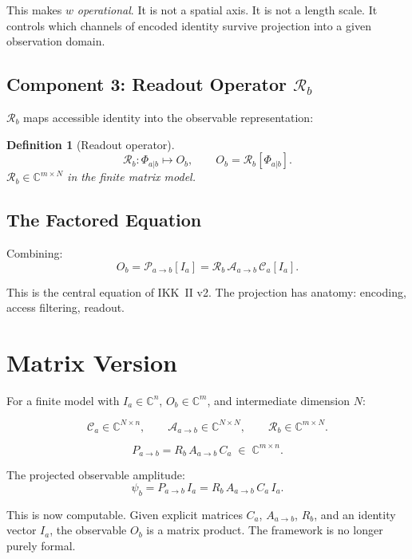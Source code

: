 \documentclass[11pt,a4paper,oneside]{article}
\newtheorem{definition}{Definition}[section]
\newcommand{\Ia}{I_a}
\newcommand{\Pab}{\mathcal{P}_{a\to b}}
\newcommand{\Ca}{\mathcal{C}_a}
\newcommand{\Aab}{\mathcal{A}_{a\to b}}
\newcommand{\Rb}{\mathcal{R}_b}
\newcommand{\PhiAb}{\Phi_{a|b}}         %
\newcommand{\psiab}{\psi_b}
\newcommand{\wcoord}{w}
\begin{document}
This makes $\wcoord$ \emph{operational}. It is not a spatial axis. It is not a length scale. It controls which channels of encoded identity survive projection into a given observation domain.

\subsection{Component 3: Readout Operator $\Rb$}

$\Rb$ maps accessible identity into the observable representation:

\begin{definition}[Readout operator]
\[
\Rb : \PhiAb \mapsto O_b,\qquad O_b = \Rb[\PhiAb].
\]
$\Rb \in \mathbb{C}^{m \times N}$ in the finite matrix model.
\end{definition}

\subsection{The Factored Equation}

Combining:
\[
\boxed{O_b = \Pab[\Ia] = \Rb\,\Aab\,\Ca[\Ia].}
\]

This is the central equation of IKK~II v2. The projection has anatomy: encoding, access filtering, readout.

\section{Matrix Version}

For a finite model with $\Ia \in \mathbb{C}^n$, $O_b \in \mathbb{C}^m$, and intermediate dimension $N$:

\[
\Ca \in \mathbb{C}^{N \times n},\qquad
\Aab \in \mathbb{C}^{N \times N},\qquad
\Rb \in \mathbb{C}^{m \times N}.
\]

\[
\boxed{P_{a\to b} = R_b\, A_{a\to b}\, C_a \;\in\; \mathbb{C}^{m \times n}.}
\]

The projected observable amplitude:
\[
\psiab = P_{a\to b}\,\Ia = R_b\, A_{a\to b}\, C_a\,\Ia.
\]

This is now computable. Given explicit matrices $C_a$, $A_{a\to b}$, $R_b$, and an identity vector $\Ia$, the observable $O_b$ is a matrix product. The framework is no longer purely formal.

\end{document}
